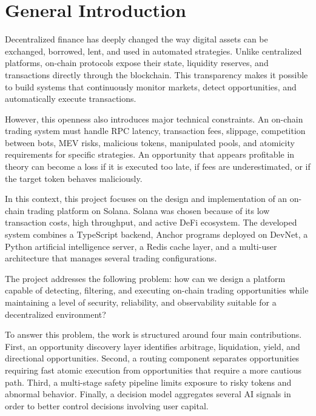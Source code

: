 \documentclass[12pt,a4paper]{report}
\begin{document}
\newpage

\chapter*{General Introduction}

Decentralized finance has deeply changed the way digital assets can be exchanged, borrowed, lent, and used in automated strategies. Unlike centralized platforms, on-chain protocols expose their state, liquidity reserves, and transactions directly through the blockchain. This transparency makes it possible to build systems that continuously monitor markets, detect opportunities, and automatically execute transactions.

However, this openness also introduces major technical constraints. An on-chain trading system must handle RPC latency, transaction fees, slippage, competition between bots, MEV risks, malicious tokens, manipulated pools, and atomicity requirements for specific strategies. An opportunity that appears profitable in theory can become a loss if it is executed too late, if fees are underestimated, or if the target token behaves maliciously.

In this context, this project focuses on the design and implementation of an on-chain trading platform on Solana. Solana was chosen because of its low transaction costs, high throughput, and active DeFi ecosystem. The developed system combines a TypeScript backend, Anchor programs deployed on DevNet, a Python artificial intelligence server, a Redis cache layer, and a multi-user architecture that manages several trading configurations.

The project addresses the following problem: how can we design a platform capable of detecting, filtering, and executing on-chain trading opportunities while maintaining a level of security, reliability, and observability suitable for a decentralized environment?

To answer this problem, the work is structured around four main contributions. First, an opportunity discovery layer identifies arbitrage, liquidation, yield, and directional opportunities. Second, a routing component separates opportunities requiring fast atomic execution from opportunities that require a more cautious path. Third, a multi-stage safety pipeline limits exposure to risky tokens and abnormal behavior. Finally, a decision model aggregates several AI signals in order to better control decisions involving user capital.
\end{document}
